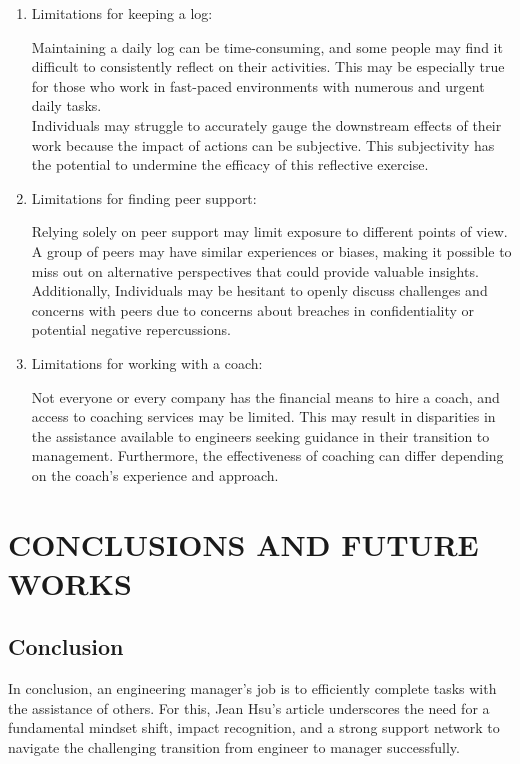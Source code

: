 \documentclass[runningheads]{article}
\begin{document}
\begin{enumerate}
    \item Limitations for keeping a log:

    Maintaining a daily log can be time-consuming, and some people may find it difficult to consistently reflect on their activities. This may be especially true for those who work in fast-paced environments with numerous and urgent daily tasks. \\
    Individuals may struggle to accurately gauge the downstream effects of their work because the impact of actions can be subjective. This subjectivity has the potential to undermine the efficacy of this reflective exercise. \\

    \item Limitations for finding peer support:

    Relying solely on peer support may limit exposure to different points of view. A group of peers may have similar experiences or biases, making it possible to miss out on alternative perspectives that could provide valuable insights. Additionally, Individuals may be hesitant to openly discuss challenges and concerns with peers due to concerns about breaches in confidentiality or potential negative repercussions. \\

    \item Limitations for working with a coach:

    Not everyone or every company has the financial means to hire a coach, and access to coaching services may be limited. This may result in disparities in the assistance available to engineers seeking guidance in their transition to management. Furthermore, the effectiveness of coaching can differ depending on the coach's experience and approach.  \\
    
\end{enumerate}

\section{CONCLUSIONS AND FUTURE WORKS}

\subsection{Conclusion}

In conclusion, an engineering manager's job is to efficiently complete tasks with the assistance of others. For this, Jean Hsu's article underscores the need for a fundamental mindset shift, impact recognition, and a strong support network to navigate the challenging transition from engineer to manager successfully. 
\end{document}
